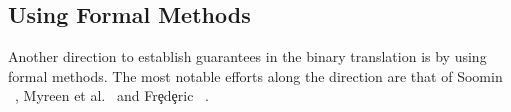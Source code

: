 %    
%    

\subsection{Using Formal Methods}
Another direction to establish guarantees in the binary translation is by using
formal methods. The most notable efforts along the direction are that of Soomin
\etal~\cite{ASE2017}, Myreen et al.~\cite{Myreen:FMCAD:2008,Myreen:FMCAD:2012}
and Fr\c{e}d\c{e}ric \etal~\cite{inlineassm}.

